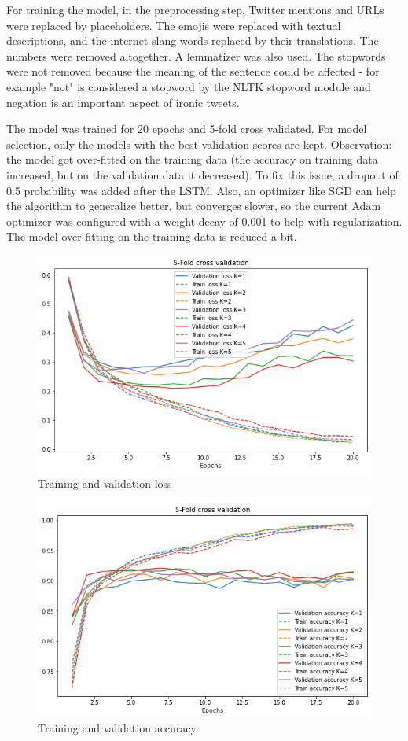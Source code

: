 \documentclass[11pt]{article}
\begin{document}
For training the model, in the preprocessing step, Twitter mentions and URLs were replaced by placeholders.
The emojis were replaced with textual descriptions, and the internet slang words replaced by their translations.
The numbers were removed altogether.
A lemmatizer was also used.
The stopwords were not removed because the meaning of the sentence could be affected - for example "not" is considered a stopword by the NLTK stopword module and negation is an important aspect of ironic tweets.

The model was trained for 20 epochs and 5-fold cross validated.
For model selection, only the models with the best validation scores are kept.
Observation: the model got over-fitted on the training data (the accuracy on training data increased, but on the validation data it decreased).
To fix this issue, a dropout of 0.5 probability was added after the LSTM.
Also, an optimizer like SGD can help the algorithm to generalize better, but converges slower, so the current Adam optimizer was configured with a weight decay of 0.001 to help with regularization.
The model over-fitting on the training data is reduced a bit.
\begin{figure}[h!]
  \includegraphics[width=\columnwidth]{train_loss_hashtags}
  \caption{Training and validation loss}\label{fig:figure}
\end{figure}
\begin{figure}[h!]
  \includegraphics[width=\columnwidth]{train_acc_hashtags}
  \caption{Training and validation accuracy}\label{fig:figure2}
\end{figure}
\end{document}
